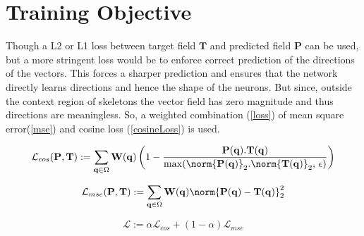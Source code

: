 \section{Training Objective}
Though a L2 or L1 loss between target field $\mathbf{T}$ and predicted field $\mathbf{P}$ can be used, but a more stringent loss would be to enforce correct prediction of the directions of the vectors. This forces a sharper prediction and ensures that the network directly learns directions and hence the shape of the neurons. But since, outside the context region of skeletons the vector field has zero magnitude and thus directions are meaningless. So, a weighted combination (\autoref{loss}) of mean square error(\autoref{mse}) and cosine loss (\autoref{cosineLoss}) is used.

\begin{equation}\label{cosineLoss}
\mathcal{L}_{cos}(\mathbf{P}, \mathbf{T}) := \sum_{\mathbf{q} \in \Omega} \mathbf{W}(\mathbf{q})\left( 1 - \frac{\mathbf{P}(\mathbf{q}).\mathbf{T}(\mathbf{q})}{\max(\norm{\mathbf{P}(\mathbf{q})}_2.\norm{\mathbf{T}(\mathbf{q})}_2,\,\epsilon)} \right)
\end{equation}

\begin{equation} \label{mse}
\mathcal{L}_{mse}(\mathbf{P}, \mathbf{T}) := \sum_{\mathbf{q} \in \Omega} \mathbf{W}(\mathbf{q}) \norm{\mathbf{P}(\mathbf{q}) - \mathbf{T}(\mathbf{q})}_2^2
\end{equation}

\begin{equation} \label{loss}
\mathcal{L} := \alpha\mathcal{L}_{cos} + (1-\alpha)\mathcal{L}_{mse}
\end{equation}


